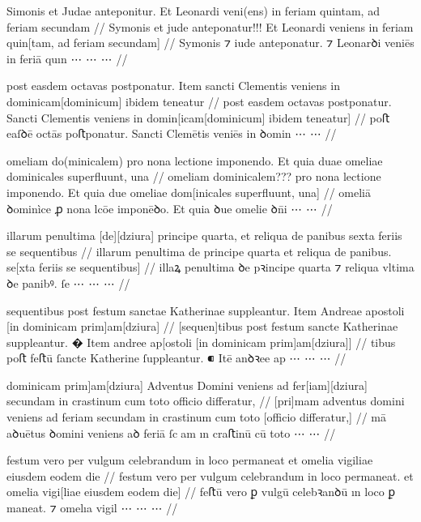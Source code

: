 \ex \bg
\gla
{}
Simonis et Judae anteponitur.
Et Leonardi veni(ens) in feriam quintam, ad feriam secundam
//
\glRekonstrukcja
{}
Symonis et jude anteponatur!!!
Et Leonardi veniens in feriam quin[tam, ad feriam secundam]
//
\glU
{}
Symonis ⁊ iude anteponatur. ⁊ Leonarꝺi veniēs in feriā quın ⋯ ⋯ ⋯
//
\endgl
\xe


\ex \bg
\gla
{}
post easdem octavas postponatur.
Item sancti Clementis veniens in dominicam[dominicum] ibidem teneatur
//
\glRekonstrukcja
{}
post easdem octavas postponatur.
{} Sancti Clementis veniens in domin[icam[dominicum] ibidem teneatur]
//
\glU
{}
poﬅ eaſꝺē octās poﬅponatur. {} Sancti Clemētis veniēs in ꝺomin ⋯ ⋯
//
\endgl
\xe


\ex \bg
\gla
{}
omeliam do(minicalem) pro nona lectione imponendo. Et quia duae
omeliae dominicales superfluunt, una 
//
\glRekonstrukcja
{}
omeliam dominicalem??? pro nona lectione imponendo. Et quia due
omeliae dom[inicales superfluunt, una]
//
\glU
{}
omeliā ꝺominìce ꝓ nona lcōe imponēꝺo. Et quia ꝺue omelie ꝺn̄i ⋯ ⋯
//
\endgl
\xe




\ex \bg
\gla
{}
illarum penultima [de][dziura] principe
quarta, et reliqua de panibus sexta feriis se sequentibus
//
\glRekonstrukcja
{}
illarum penultima de principe
quarta et reliqua de panibus. se[xta feriis se sequentibus]
//
\glU
{}
illaꝝ penultima ꝺe pꝛincipe quarta ⁊ reliqua vltima ꝺe panibꝰ. ſe ⋯ ⋯ ⋯
//
\endgl
\xe



\ex \bg
\gla
{}
sequentibus post festum
sanctae Katherinae suppleantur.
{} Item Andreae apostoli [in dominicam prim]am[dziura]
//
\glRekonstrukcja
{}
[sequen]tibus post festum
sancte Katherinae suppleantur.
� Item andree ap[ostoli [in dominicam prim]am[dziura]]
//
\glU
{}
tibus poﬅ feﬅū ſancte Katherine ſuppleantur. ⁌ Itē anꝺꝛee ap ⋯ ⋯ ⋯
//
\endgl
\xe


\ex \bg
\gla
{}
dominicam prim]am[dziura] Adventus Domini
veniens ad fer[iam][dziura] secundam in crastinum cum toto officio differatur,
//
\glRekonstrukcja
{}
[pri]mam adventus domini
veniens ad feriam secundam in crastinum cum toto [officio differatur,]
//
\glU
{}
mā aꝺuētus ꝺomini veniens aꝺ feriā ſcam ın craﬅinū cū toto ⋯ ⋯
//
\endgl
\xe



\ex \bg
\gla
festum vero per vulgum celebrandum in loco permaneat et omelia vigiliae eiusdem eodem die 
//
\glRekonstrukcja
festum vero per vulgum celebrandum in loco permaneat. et omelia vigi[liae eiusdem eodem die]
//
\glU
{}
feﬅū vero ꝑ vulgū celebꝛanꝺū ın loco {ꝑ maneat.} ⁊ omelıa vigil ⋯ ⋯ ⋯
//
\endgl
\xe




